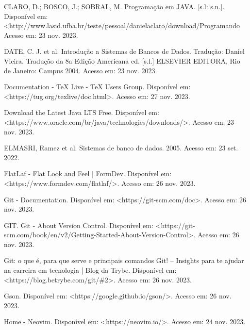 \documentclass[a4paper,12pt]{article}
\begin{document}
\noindent CLARO, D.; BOSCO, J.; SOBRAL, M. Programação em JAVA. [s.l: s.n.]. 
Disponível em: <http://www.lasid.ufba.br/teste/pessoal/danielaclaro/download/Programando\\%
Acesso em: 23 nov. 2023. \linebreak

\noindent DATE, C. J. et al. Introdução a Sistemas de Bancos de Dados. Tradução: Daniel Vieira. Tradução da 8a Edição Americana ed. [s.l.] 
ELSEVIER EDITORA, Rio de Janeiro: Campus 2004. Acesso em: 23 nov. 2023. \linebreak

\noindent Documentation - TeX Live - TeX Users Group. Disponível em: <https://tug.org/texlive/doc.html>. Acesso em: 27 nov. 2023. \linebreak

\noindent Download the Latest Java LTS Free. Disponível em: <https://www.oracle.com/br/java/technologies/downloads/>. 
Acesso em: 23 nov. 2023. \linebreak

\noindent ELMASRI, Ramez et al. Sistemas de banco de dados. 2005. Acesso em: 23 set. 2022. \linebreak

\noindent FlatLaf - Flat Look and Feel | FormDev. Disponível em: <https://www.formdev.com/flatlaf/>. Acesso em: 26 nov. 2023. \linebreak

\noindent Git - Documentation. Disponível em: <https://git-scm.com/doc>. ‌Acesso em: 26 nov. 2023. \linebreak

\noindent GIT. Git - About Version Control. Disponível em: <https://git-scm.com/book/en/v2/Getting-Started-About-Version-Control>.
‌Acesso em: 26 nov. 2023. \linebreak

\noindent Git: o que é, para que serve e principais comandos Git! – Insights para te ajudar na carreira em tecnologia | Blog da Trybe. 
Disponível em: <https://blog.betrybe.com/git/\#2>. Acesso em: 26 nov. 2023.

\noindent Gson. Disponível em: <https://google.github.io/gson/>. Acesso em: 26 nov. 2023. \linebreak

\noindent Home - Neovim. Disponível em: <https://neovim.io/>. Acesso em: 24 nov. 2023. \linebreak
\end{document}
